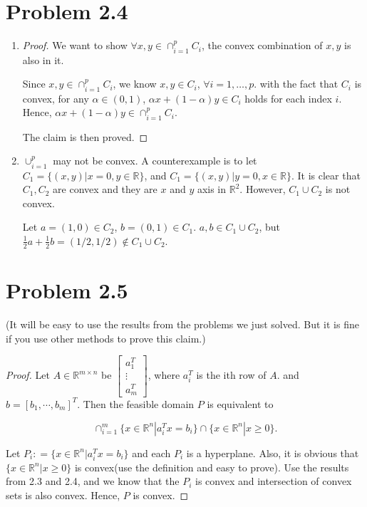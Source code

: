 \documentclass[12pt]{article}
\begin{document}
\section*{Problem 2.4}

\begin{enumerate}
\item

\begin{proof}

We want to show $\forall x, y \in \cap_{i = 1}^ p C_i$, the convex combination of $x, y$ is also in it.

Since $x, y \in \cap_{i = 1}^ p C_i$, we know $x, y \in C_i$, $\forall i = 1,\dots, p$. with the fact that $C_i$ is convex, for any $\alpha \in (0, 1)$, $\alpha x + (1-\alpha) y \in C_i$ holds for each index $i$. Hence, $\alpha x + (1-\alpha) y \in \cap_{i=1} ^ p C_i$. 

The claim is then proved.

\end{proof}

\item
$\cup_{i=1}^p$ may not be convex. A counterexample is to let $C_1 = \{(x, y)| x = 0, y\in\mathbb{R}\}$, and $C_1 = \{(x, y)| y = 0, x\in\mathbb{R}\}$. It is clear that $C_1, C_2$ are convex and they are $x$ and $y$ axis in $\mathbb{R}^2$. However, $C_1\cup C_2$ is not convex. 

Let $a = (1, 0) \in C_2$, $b = (0, 1)\in C_1$. $a, b \in C_1\cup C_2$, but $\frac{1}{2} a + \frac{1}{2}b = (1/2, 1/2) \notin C_1\cup C_2$.

\end{enumerate}


\section*{Problem 2.5}

(It will be easy to use the results from the problems we just solved. But it is fine if you use other methods to prove this claim.)

\begin{proof}

Let $A \in \mathbb{R}^{m\times n}$ be $\begin{bmatrix}
a_1^T \\
\vdots \\
a_m^T
\end{bmatrix}
$, where $a_i^T$ is the ith row of $A$. 
and $b = [b_1, \cdots, b_m]^T$. Then the feasible domain $P$ is equivalent to 

$$
\cap_{i=1}^m \{ x\in\mathbb{R}^n | a_i^T x = b_i  \} \cap \{x\in\mathbb{R}^n | x \geqslant 0\}.
$$

Let $P_i : = \{ x\in\mathbb{R}^n | a_i^T x = b_i  \}$ and each $P_i$ is a hyperplane. Also, it is obvious that $\{x\in\mathbb{R}^n | x \geqslant 0\}$ is convex(use the definition and easy to prove). Use the results from 2.3 and 2.4, and we know that the $P_i$ is convex and intersection of convex sets is also convex. Hence, $P$ is convex.

\end{proof}
\end{document}
